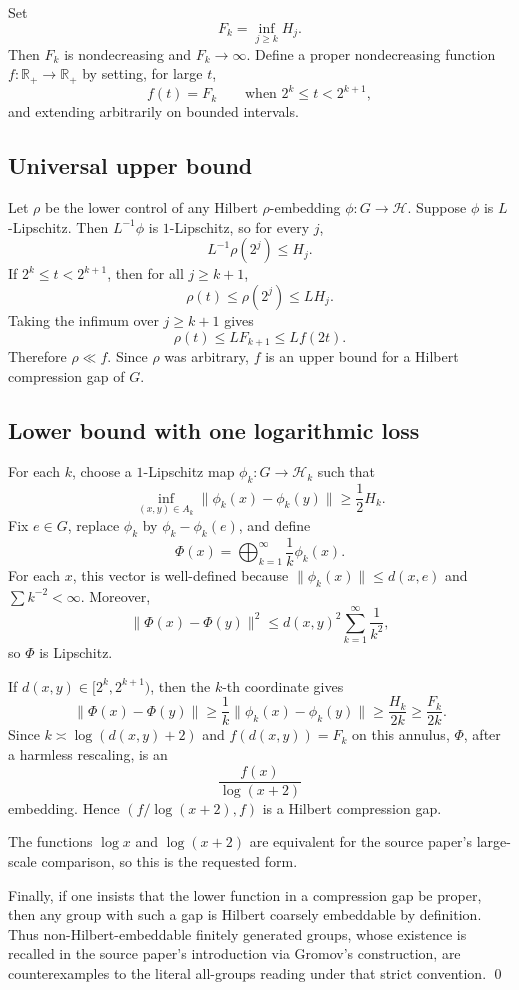 \documentclass[11pt]{article}
\newcommand{\R}{\mathbb R}
\newcommand{\Hilb}{\mathcal H}
\begin{document}
Set
\[
        F_k=\inf_{j\ge k} H_j .
\]
Then \(F_k\) is nondecreasing and \(F_k\to\infty\).  Define a proper
nondecreasing function \(f:\R_+\to\R_+\) by setting, for large \(t\),
\[
        f(t)=F_k \qquad\text{when } 2^k\le t<2^{k+1},
\]
and extending arbitrarily on bounded intervals.

\subsection*{Universal upper bound}

Let \(\rho\) be the lower control of any Hilbert \(\rho\)-embedding
\(\phi:G\to\Hilb\).  Suppose \(\phi\) is \(L\)-Lipschitz.  Then \(L^{-1}\phi\)
is \(1\)-Lipschitz, so for every \(j\),
\[
        L^{-1}\rho(2^j)\le H_j.
\]
If \(2^k\le t<2^{k+1}\), then for all \(j\ge k+1\),
\[
        \rho(t)\le \rho(2^j)\le L H_j.
\]
Taking the infimum over \(j\ge k+1\) gives
\[
        \rho(t)\le L F_{k+1}\le L f(2t).
\]
Therefore \(\rho\ll f\).  Since \(\rho\) was arbitrary, \(f\) is an upper
bound for a Hilbert compression gap of \(G\).

\subsection*{Lower bound with one logarithmic loss}

For each \(k\), choose a \(1\)-Lipschitz map
\(\phi_k:G\to\Hilb_k\) such that
\[
        \inf_{(x,y)\in A_k}\|\phi_k(x)-\phi_k(y)\|\ge \frac12 H_k.
\]
Fix \(e\in G\), replace \(\phi_k\) by \(\phi_k-\phi_k(e)\), and define
\[
        \Phi(x)=\bigoplus_{k=1}^\infty \frac{1}{k}\phi_k(x).
\]
For each \(x\), this vector is well-defined because
\(\|\phi_k(x)\|\le d(x,e)\) and \(\sum k^{-2}<\infty\).  Moreover,
\[
        \|\Phi(x)-\Phi(y)\|^2
        \le d(x,y)^2 \sum_{k=1}^\infty \frac{1}{k^2},
\]
so \(\Phi\) is Lipschitz.

If \(d(x,y)\in[2^k,2^{k+1})\), then the \(k\)-th coordinate gives
\[
        \|\Phi(x)-\Phi(y)\|
        \ge \frac{1}{k}\|\phi_k(x)-\phi_k(y)\|
        \ge \frac{H_k}{2k}
        \ge \frac{F_k}{2k}.
\]
Since \(k\asymp \log(d(x,y)+2)\) and \(f(d(x,y))=F_k\) on this annulus,
\(\Phi\), after a harmless rescaling, is an
\[
        \frac{f(x)}{\log(x+2)}
\]
embedding.  Hence \((f/\log(x+2),f)\) is a Hilbert compression gap.

The functions \(\log x\) and \(\log(x+2)\) are equivalent for the source
paper's large-scale comparison, so this is the requested form.

Finally, if one insists that the lower function in a compression gap be
proper, then any group with such a gap is Hilbert coarsely embeddable by
definition.  Thus non-Hilbert-embeddable finitely generated groups, whose
existence is recalled in the source paper's introduction via Gromov's
construction, are counterexamples to the literal all-groups reading under that
strict convention.
\qed
\end{document}

